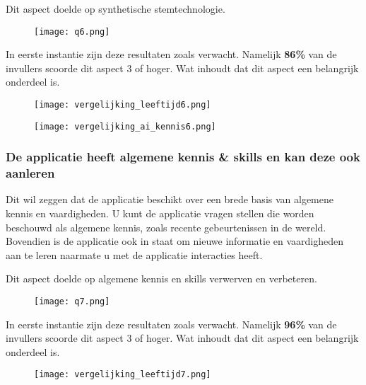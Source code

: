 Dit aspect doelde op synthetische stemtechnologie.

\begin{figure}[htbp]
    \centering
    \texttt{[image: q6.png]}
    \label{fig:vraag_6_resultaat}
\end{figure}

In eerste instantie zijn deze resultaten zoals verwacht. Namelijk \textbf{86\%} van de invullers scoorde dit aspect 3 of hoger. Wat inhoudt dat dit aspect een belangrijk onderdeel is.

\begin{figure}[htbp]
    \centering
    \texttt{[image: vergelijking\_leeftijd6.png]}
    \label{fig:vergelijking_leeftijd6}
\end{figure}

\begin{figure}[htbp]
    \centering
    \texttt{[image: vergelijking\_ai\_kennis6.png]}
    \label{fig:vergelijking_ai_kennis6}
\end{figure}

\newpage

\subsubsection{De applicatie heeft algemene kennis \& skills en kan deze ook aanleren}

Dit wil zeggen dat de applicatie beschikt over een brede basis van algemene kennis en vaardigheden. U kunt de applicatie vragen stellen die worden beschouwd als algemene kennis, zoals recente gebeurtenissen in de wereld. Bovendien is de applicatie ook in staat om nieuwe informatie en vaardigheden aan te leren naarmate u met de applicatie interacties heeft.

Dit aspect doelde op algemene kennis en skills verwerven en verbeteren.

\begin{figure}[htbp]
    \centering
    \texttt{[image: q7.png]}
    \label{fig:vraag_7_resultaat}
\end{figure}

In eerste instantie zijn deze resultaten zoals verwacht. Namelijk \textbf{96\%} van de invullers scoorde dit aspect 3 of hoger. Wat inhoudt dat dit aspect een belangrijk onderdeel is.

\begin{figure}[htbp]
    \centering
    \texttt{[image: vergelijking\_leeftijd7.png]}
    \label{fig:vergelijking_leeftijd7}
\end{figure}

